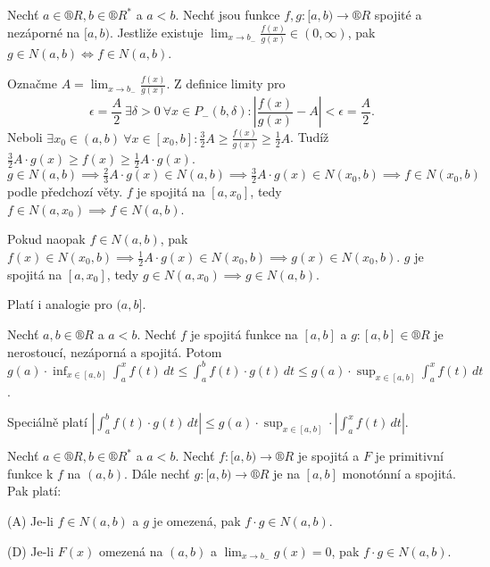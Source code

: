 \documentclass[12pt]{article}                   %
\begin{document}
        \begin{veta}
            Nechť $a \in ®R, b \in ®R^*$ a $a < b$. Nechť jsou funkce $f, g: [a, b) \rightarrow ®R$ spojité a nezáporné na $[a, b)$. Jestliže existuje $\lim_{x \rightarrow b_-} \frac{f(x)}{g(x)} \in (0, ∞)$, pak $g \in N(a, b) \Leftrightarrow f \in N(a, b)$.

            \begin{dukazin}
                Označme $A = \lim_{x \rightarrow b_-} \frac{f(x)}{g(x)}$. Z definice limity pro
                $$ \epsilon = \frac{A}{2}\ \exists \delta > 0\ \forall x \in P_-(b, \delta): \left|\frac{f(x)}{g(x)} - A\right| < \epsilon = \frac{A}{2}. $$
                Neboli $\exists x_0 \in (a, b)\ \forall x \in [x_0, b]: \frac{3}{2}A ≥ \frac{f(x)}{g(x)} ≥ \frac{1}{2}A$. Tudíž $\frac{3}{2}A·g(x) ≥ f(x) ≥ \frac{1}{2}A·g(x)$. $g \in N(a, b) \implies \frac{2}{3}A·g(x) \in N(a, b) \implies \frac{3}{2}A·g(x)\in N(x_0, b) \implies f\in N(x_0, b)$ podle předchozí věty. $f$ je spojitá na $[a, x_0]$, tedy $f \in N(a, x_0) \implies f \in N(a, b)$.

                Pokud naopak $f \in N(a, b)$, pak $f(x) \in N(x_0, b) \implies \frac{1}{2}A·g(x) \in N(x_0, b) \implies g(x) \in N(x_0, b)$. $g$ je spojitá na $[a, x_0]$, tedy $g \in N(a, x_0) \implies g \in N(a, b)$.
            \end{dukazin}
        \end{veta}

        \begin{poznamka}
            Platí i analogie pro $(a, b]$.
        \end{poznamka}

        \begin{lemma}
            Nechť $a, b \in ®R$ a $a < b$. Nechť $f$ je spojitá funkce na $[a, b]$ a $g:[a, b] \in ®R$ je nerostoucí, nezáporná a spojitá. Potom $g(a)·\inf_{x \in [a, b]} \int_a^x f(t)\,dt ≤ \int_a^b f(t)·g(t)\,dt ≤ g(a)·\sup_{x \in [a, b]}\int_a^x f(t)\,dt$.

            Speciálně platí $|\int_a^b f(t)·g(t)\,dt| ≤ g(a)·\sup_{x \in [a, b]}·|\int_a^x f(t)\,dt|$.
        \end{lemma}

        \begin{veta}
            Nechť $a \in ®R, b \in ®R^*$ a $a < b$. Nechť $f:[a, b) \rightarrow ®R$ je spojitá a $F$ je primitivní funkce k $f$ na $(a, b)$. Dále nechť $g:[a, b) \rightarrow ®R$ je na $[a, b]$ monotónní a spojitá. Pak platí:

            (A) Je-li $f \in N(a, b)$ a $g$ je omezená, pak $f·g \in N(a, b)$.

            (D) Je-li $F(x)$ omezená na $(a, b)$ a $\lim_{x \rightarrow b_-} g(x) = 0$, pak $f·g \in N(a, b)$.
        \end{veta}
\end{document}
